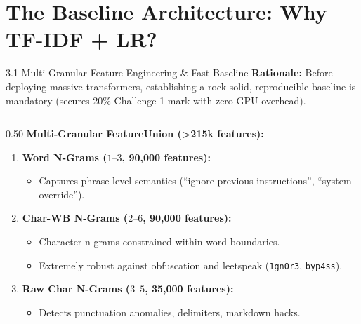 \documentclass[aspectratio=169]{beamer}
\begin{document}
\section{The Baseline Architecture: Why TF-IDF + LR?}

\begin{frame}{3.1 Multi-Granular Feature Engineering \& Fast Baseline}
\textbf{Rationale:} Before deploying massive transformers, establishing a rock-solid, reproducible baseline is mandatory (secures 20\% Challenge 1 mark with zero GPU overhead).

\vspace{0.2cm}
\begin{columns}[T]
\begin{column}{0.50\textwidth}
\textbf{Multi-Granular FeatureUnion (>215k features):}
\begin{enumerate}
    \item \textbf{Word N-Grams ($1\text{--}3$, 90,000 features):}
    \begin{itemize}
        \item Captures phrase-level semantics (``ignore previous instructions'', ``system override'').
    \end{itemize}
    \item \textbf{Char-WB N-Grams ($2\text{--}6$, 90,000 features):}
    \begin{itemize}
        \item Character n-grams constrained within word boundaries.
        \item Extremely robust against obfuscation and leetspeak (\texttt{1gn0r3}, \texttt{byp4ss}).
    \end{itemize}
    \item \textbf{Raw Char N-Grams ($3\text{--}5$, 35,000 features):}
    \begin{itemize}
        \item Detects punctuation anomalies, delimiters, markdown hacks.
    \end{itemize}
\end{enumerate}
\end{column}


\end{columns}
\end{frame}
\end{document}
